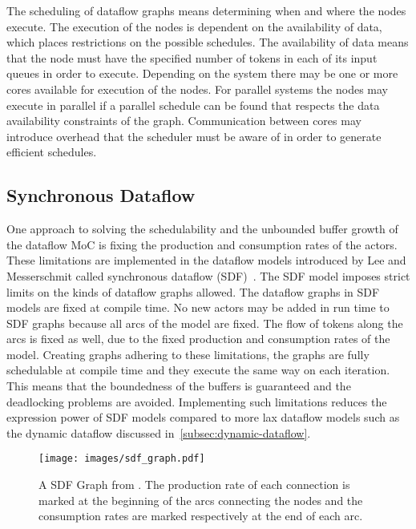 The scheduling of dataflow graphs means determining when and where the nodes execute. The execution of the nodes is dependent on the availability of data, which places restrictions on the possible schedules. The availability of data means that the node must have the specified number of tokens in each of its input queues in order to execute. Depending on the system there may be one or more cores available for execution of the nodes. For parallel systems the nodes may execute in parallel if a parallel schedule can be found that respects the data availability constraints of the graph. Communication between cores may introduce overhead that the scheduler must be aware of in order to generate efficient schedules.~\cite{lee1987synchronous}

\subsection{Synchronous Dataflow}
\label{subsec:synchronous-dataflow}
\FloatBarrier
One approach to solving the schedulability and the unbounded buffer growth of the dataflow MoC is fixing the production and consumption rates of the actors. These limitations are implemented in the dataflow models introduced by Lee and Messerschmit called synchronous dataflow (SDF)~\cite{lee1987synchronous}. The SDF model imposes strict limits on the kinds of dataflow graphs allowed. The dataflow graphs in SDF models are fixed at compile time. No new actors may be added in run time to SDF graphs because all arcs of the model are fixed. The flow of tokens along the arcs is fixed as well, due to the fixed production and consumption rates of the model. Creating graphs adhering to these limitations, the graphs are fully schedulable at compile time and they execute the same way on each iteration. This means that the boundedness of the buffers is guaranteed and the deadlocking problems are avoided. Implementing such limitations reduces the expression power of SDF models compared to more lax dataflow models such as the dynamic dataflow discussed in~\ref{subsec:dynamic-dataflow}.~\cite{lee2015introduction}

\begin{figure}[h!]
    \begin{center}
        \texttt{[image: images/sdf\_graph.pdf]}
        \caption{A SDF Graph from \cite{ade1997data}. The production rate of each connection is marked at the beginning of the arcs connecting the nodes and the consumption rates are marked respectively at the end of each arc.}
        \label{fig:sdf_graph}
    \end{center}
\end{figure}

